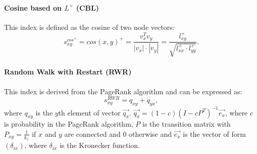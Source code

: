 \documentclass{llncs}
\begin{document}
\paragraph{Cosine based on $L^+$ (CBL)}
%
This index is defined as the cosine of two node vectors:
\begin{equation}
s_{xy}^{cos^{+}} = cos(x, y)^{+} = \frac{v_x^T v_y}{|v_x| \cdot |v_y|} = \frac{l_{xy}^{+}}{\sqrt{l_{xx}^{+}\cdot l_{yy}^{+}}}.
\end{equation}
%
\paragraph{Random Walk with Restart (RWR)}
%
This index is derived from the PageRank algorithm and can be expressed as:
\begin{equation}
s_{xy}^{RWR} = q_{xy} + q_{yx},
\end{equation}
where $q_{xy}$ is the $y$th element of vector $\overrightarrow{q_x}$. $\overrightarrow{q_x} = (1 - c)(I - cP^{T})^{-1} \overrightarrow{e_x}$, where $c$ is probability in the PageRank algorithm, $P$ is the transition matrix with $P_{xy} = \frac{1}{k_x}$ if $x$ and $y$ are connected and $0$ otherwise and $\overrightarrow{e_x}$ is the vector of form $(\delta_{ix})$, where $\delta_{ix}$ is the Kronecker function. 
%
\end{document}
